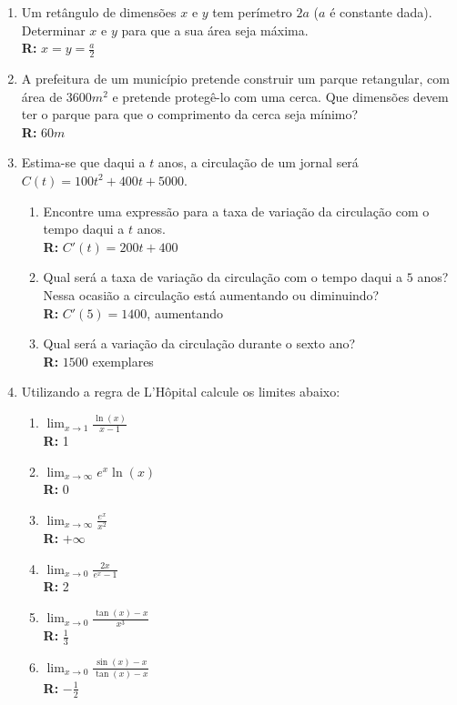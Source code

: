 \documentclass[oneside,a4paper,12pt]{article}
\begin{document}
\begin{enumerate}
    \item Um retângulo de dimensões $x$ e $y$ tem perímetro $2a$ ($a$ é constante dada). Determinar $x$ e $y$ para que a sua área seja máxima. \\\textbf{R: } $x=y=\displaystyle \frac{a}{2}$
    
    \item A prefeitura de um município pretende construir um parque retangular, com área de $3600m^2$ e pretende protegê-lo com uma cerca. Que dimensões devem ter o parque para que o comprimento da cerca seja mínimo? \\\textbf{R: }$60m$
    
    \item Estima-se que daqui a $t$ anos, a circulação de um jornal será $C(t) = 100t^2 + 400t + 5000$.
        \begin{enumerate}
        \item Encontre uma expressão para a taxa de variação da circulação com o tempo daqui a $t$ anos. \\\textbf{R: } $C'(t) = 200t+400$
        \item Qual será a taxa de variação da circulação com o tempo daqui a $5$ anos? Nessa ocasião a circulação está aumentando ou diminuindo? \\\textbf{R: } $C'(5) = 1400$, aumentando
        \item Qual será a variação da circulação durante o sexto ano? \\\textbf{R: } $1500$ exemplares
        \end{enumerate}

    \item Utilizando a regra de L'Hôpital calcule os limites abaixo:
        \begin{enumerate}
         \item $\displaystyle \lim_{x\to 1} \displaystyle \frac{\ln(x)}{x-1}$ \\\textbf{R: }1
         \item $\displaystyle \lim_{x\to \infty} e^x\ln(x)$ \\\textbf{R: }0
         \item $\displaystyle \lim_{x\to \infty} \displaystyle \frac{e^x}{x^2}$ \\\textbf{R: } $+\infty$
         \item $\displaystyle \lim_{x\to 0} \displaystyle \frac{2x}{e^x - 1}$ \\\textbf{R: }2
         \item $\displaystyle \lim_{x\to 0} \displaystyle \frac{\tan(x) -x}{x^3}$ \\\textbf{R: } $\displaystyle \frac{1}{3}$
         \item $\displaystyle \lim_{x\to 0} \displaystyle \frac{\sin(x) - x}{\tan(x)-x}$ \\\textbf{R: } $\displaystyle -\frac{1}{2}$
        \end{enumerate}
        

\end{enumerate}
\end{document}
